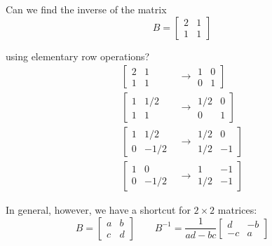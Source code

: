 \documentclass{article}
\begin{document}
\begin{example}
  Can we find the inverse of the matrix
  \[
    B = \left[\begin{matrix}
      2 & 1 \\ 1 & 1
    \end{matrix}\right]
  \]

  using elementary row operations?
  \begin{equation}
    \begin{array}{rl}
      \left[
      \begin{matrix}
        2 & 1 \\
        1 & 1
      \end{matrix}
      \right.
      & \to
      \left.
      \begin{matrix}
        1 & 0 \\
        0 & 1
      \end{matrix}
      \right]
      \\[24pt]
      \left[
      \begin{matrix}
        1 & 1/2 \\
        1 & 1
      \end{matrix}
      \right.
      & \to
      \left.
      \begin{matrix}
        1/2 & 0 \\
        0 & 1
      \end{matrix}
      \right]
      \\[24pt]
      \left[
      \begin{matrix}
        1 & 1/2 \\
        0 & -1/2
      \end{matrix}
      \right.
      & \to
      \left.
      \begin{matrix}
        1/2 & 0 \\
        1/2 & -1
      \end{matrix}
      \right]
      \\[24pt]
      \left[
      \begin{matrix}
        1 & 0 \\
        0 & -1/2
      \end{matrix}
      \right.
      & \to
      \left.
      \begin{matrix}
        1 & -1 \\
        1/2 & -1
      \end{matrix}
      \right]
    \end{array}
    \nonumber
  \end{equation}

  In general, however, we have a shortcut for $2 \times 2$ matrices:
  \[
    B = \left[\begin{matrix}
      a & b \\ c & d
    \end{matrix}\right]
    \quad\quad
    B^{-1}
    =
    \dfrac{1}{ad - bc}
    \left[\begin{matrix}
      d & -b \\ -c & a
    \end{matrix}\right]
    \quad\quad
  \]
\end{example}
\end{document}
